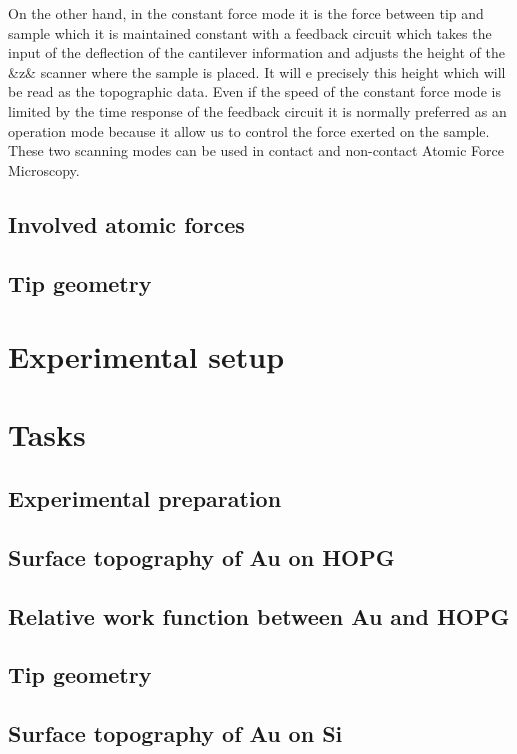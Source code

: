 \documentclass{article}
\begin{document}
On the other hand, in the constant force mode it is the force between tip and sample which it is maintained constant with a feedback circuit which takes the input of the deflection of the cantilever information and adjusts the height of the &z& scanner where the sample is placed. It will e precisely this height which will be read as the topographic data. Even if the speed of the constant force mode is limited by the time response of the feedback circuit it is normally preferred as an operation mode because it allow us to control the force exerted on the sample. These two scanning modes can be used in contact and non-contact Atomic Force Microscopy.

\subsection{Involved atomic forces}

\subsection{Tip geometry}

\section{Experimental setup}

\section{Tasks}

\subsection{Experimental preparation}

\subsection{Surface topography of Au on HOPG}

\subsection{Relative work function between Au and HOPG}

\subsection{Tip geometry}

\subsection{Surface topography of Au on Si}
\end{document}
